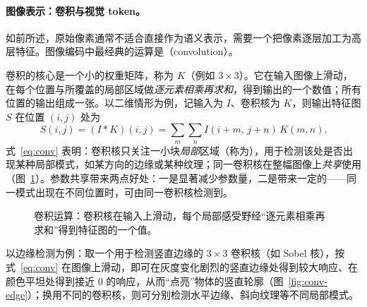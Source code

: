 \paragraph{图像表示：卷积与视觉 token。}如前所述，原始像素通常不适合直接作为语义表示，需要一个把像素逐层加工为高层特征。图像编码中最经典的运算是（convolution）。

卷积的核心是一个小的权重矩阵，称为 $K$（例如 $3\times3$）。它在输入图像上滑动，在每个位置与所覆盖的局部区域做\emph{逐元素相乘再求和}，得到输出的一个数值；所有位置的输出组成一张。以二维情形为例，记输入为 $I$、卷积核为 $K$，则输出特征图 $S$ 在位置 $(i,j)$ 处为
\begin{equation}
  S(i,j)=(I * K)(i,j)=\sum_{m}\sum_{n} I(i+m,\,j+n)\,K(m,n).
  \label{eq:conv}
\end{equation}
式~\eqref{eq:conv} 表明：卷积核只关注一小块\emph{局部}区域（称为），用于检测该处是否出现某种局部模式，如某方向的边缘或某种纹理；同一卷积核在整幅图像上\emph{共享}使用（图~\ref{fig:conv}）。参数共享带来两点好处：一是显著减少参数量，二是带来一定的——同一模式出现在不同位置时，可由同一卷积核检测到。

\begin{figure}[htbp]
  \centering
  \caption{卷积运算：卷积核在输入上滑动，每个局部感受野经“逐元素相乘再求和”得到特征图的一个值。}
  \label{fig:conv}
\end{figure}

以边缘检测为例：取一个用于检测竖直边缘的 $3\times3$ 卷积核（如 Sobel 核），按式~\eqref{eq:conv} 在图像上滑动，即可在灰度变化剧烈的竖直边缘处得到较大响应、在颜色平坦处得到接近 $0$ 的响应，从而“点亮”物体的竖直轮廓（图~\ref{fig:conv-edge}）；换用不同的卷积核，则可分别检测水平边缘、斜向纹理等不同局部模式。

